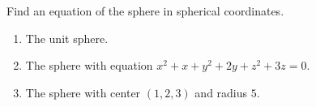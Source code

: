 Find an equation of the sphere in spherical coordinates.

\begin{enumerate}
\item The unit sphere.
\item The sphere with equation $x^2 +x+ y^2+2y + z^2 +3z=0$.
\item The sphere with center $(1,2,3)$ and radius $5$.
\end{enumerate}